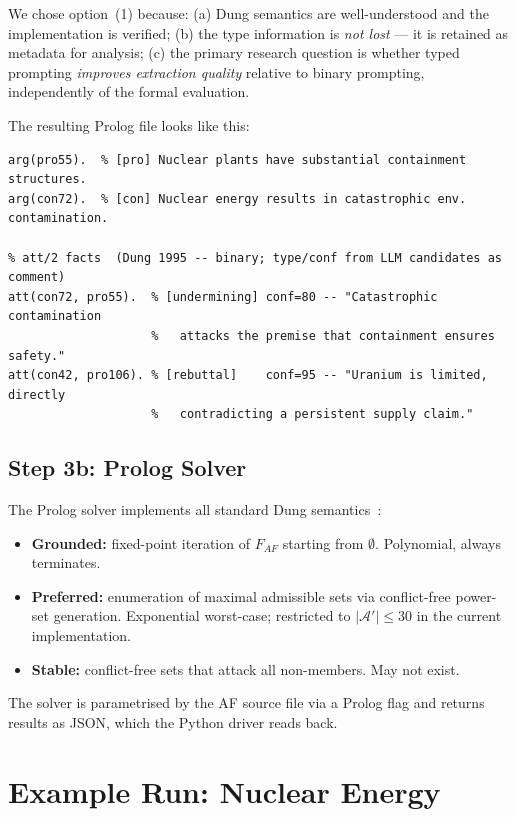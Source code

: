 \documentclass[runningheads]{llncs}
\begin{document}
We chose option~(1) because: (a) Dung semantics are well-understood and
the implementation is verified; (b) the type information is \emph{not
lost} — it is retained as metadata for analysis; (c) the primary research
question is whether typed prompting \emph{improves extraction quality}
relative to binary prompting, independently of the formal evaluation.

The resulting Prolog file looks like this:

\begin{lstlisting}[style=prolog]
% arg/1 facts
arg(pro55).  % [pro] Nuclear plants have substantial containment structures.
arg(con72).  % [con] Nuclear energy results in catastrophic env. contamination.

% att/2 facts  (Dung 1995 -- binary; type/conf from LLM candidates as comment)
att(con72, pro55).  % [undermining] conf=80 -- "Catastrophic contamination
                    %   attacks the premise that containment ensures safety."
att(con42, pro106). % [rebuttal]    conf=95 -- "Uranium is limited, directly
                    %   contradicting a persistent supply claim."
\end{lstlisting}

\subsection{Step 3b: Prolog Solver}

The Prolog solver implements all standard Dung semantics~\cite{cerutti2014}:

\begin{itemize}
  \item \textbf{Grounded:} fixed-point iteration of $F_{AF}$ starting from
    $\emptyset$. Polynomial, always terminates.
  \item \textbf{Preferred:} enumeration of maximal admissible sets via
    conflict-free power-set generation. Exponential worst-case; restricted
    to $|\mathcal{A}'| \leq 30$ in the current implementation.
  \item \textbf{Stable:} conflict-free sets that attack all non-members.
    May not exist.
\end{itemize}

The solver is parametrised by the AF source file via a Prolog flag and
returns results as JSON, which the Python driver reads back.

\section{Example Run: Nuclear Energy}
\label{sec:example}
\end{document}
